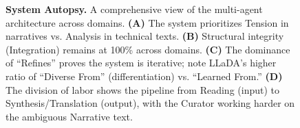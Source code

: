 \begin{figure}[p]
    \caption{\textbf{System Autopsy.} A comprehensive view of the multi-agent architecture across domains.
    \textbf{(A)} The system prioritizes Tension in narratives vs. Analysis in technical texts.
    \textbf{(B)} Structural integrity (Integration) remains at 100\% across domains.
    \textbf{(C)} The dominance of ``Refines'' proves the system is iterative; note LLaDA's higher ratio of ``Diverse From'' (differentiation) vs. ``Learned From.''
    \textbf{(D)} The division of labor shows the pipeline from Reading (input) to Synthesis/Translation (output), with the Curator working harder on the ambiguous Narrative text.}
    \label{fig:dashboard}
\end{figure}
